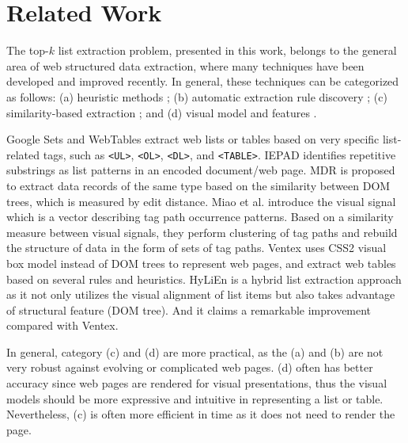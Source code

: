 \section{Related Work}
\label{sec:related}
The top-$k$ list extraction problem, presented in this work,
belongs to the general area of web structured data extraction,
where many techniques have been developed and improved recently.
In general, these techniques can be categorized as follows:
(a) heuristic methods \cite{googlesets,webtables08};
(b) automatic extraction rule discovery \cite{ChangL01:IEPAD};
(c) similarity-based extraction \cite{LiuGZ03:MDR,MiaoTHSM09:TagPathClustering}; and
(d) visual model and features \cite{GatterbauerBHKP2007:Towards, FumarolaWBMH11:List}.

Google Sets \cite{googlesets} and WebTables \cite{webtables08}
extract web lists or tables based
on very specific list-related tags, such as {\tt <UL>},
{\tt<OL>}, {\tt<DL>}, and {\tt<TABLE>}.
IEPAD \cite{ChangL01:IEPAD}
identifies repetitive substrings as list patterns
in an encoded document/web page.
MDR \cite{LiuGZ03:MDR} is proposed to extract data records of the same type
based on the similarity between DOM trees, which is measured by edit distance.
Miao et al. \cite{MiaoTHSM09:TagPathClustering} introduce the visual signal
which is a vector describing tag path occurrence patterns.
Based on a similarity measure between visual signals, they perform clustering of tag
paths and rebuild the structure of data in the form of sets of tag paths.
Ventex \cite{GatterbauerBHKP2007:Towards} uses CSS2 visual box
model \cite{CCS2Box} instead of DOM trees to represent web pages,
and extract web tables based on several rules and heuristics.
HyLiEn \cite{FumarolaWBMH11:List} is a hybrid list extraction approach
as it not only utilizes the visual alignment of list items
but also takes advantage of structural feature (DOM tree).
And it claims a remarkable improvement compared with Ventex\cite{GatterbauerBHKP2007:Towards}.

In general,  category (c) and (d) are more practical,
as the (a) and (b) are not very robust against evolving or complicated web pages.
(d) often has better accuracy since web pages are rendered for visual presentations,
thus the visual models should be more expressive
and intuitive in representing a list or table.
Nevertheless, (c) is often more efficient in time as it does not need to render the page.

